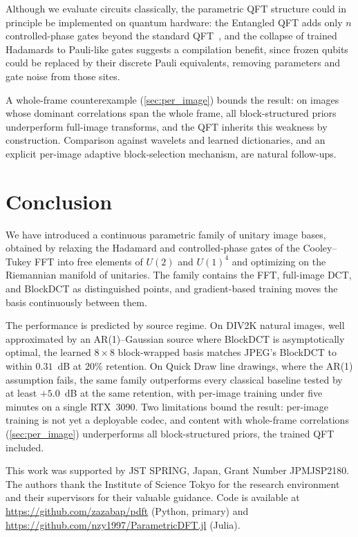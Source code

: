 \documentclass[a4paper, twocolumn]{quantumarticle}
\begin{document}
Although we evaluate circuits classically, the parametric QFT structure could in principle be implemented on quantum hardware: the Entangled QFT adds only $n$ controlled-phase gates beyond the standard QFT~\cite{luo2020yao, markov2008simulating}, and the collapse of trained Hadamards to Pauli-like gates suggests a compilation benefit, since frozen qubits could be replaced by their discrete Pauli equivalents, removing parameters and gate noise from those sites.

A whole-frame counterexample (\cref{sec:per_image}) bounds the result: on images whose dominant correlations span the whole frame, all block-structured priors underperform full-image transforms, and the QFT inherits this weakness by construction. Comparison against wavelets and learned dictionaries, and an explicit per-image adaptive block-selection mechanism, are natural follow-ups.

\section{Conclusion}
\label{sec:conclusion}

We have introduced a continuous parametric family of unitary image bases, obtained by relaxing the Hadamard and controlled-phase gates of the Cooley--Tukey FFT into free elements of $U(2)$ and $U(1)^4$ and optimizing on the Riemannian manifold of unitaries. The family contains the FFT, full-image DCT, and BlockDCT as distinguished points, and gradient-based training moves the basis continuously between them.

The performance is predicted by source regime. On DIV2K natural images, well approximated by an AR(1)--Gaussian source where BlockDCT is asymptotically optimal, the learned $8 \times 8$ block-wrapped basis matches JPEG's BlockDCT to within $0.31$~dB at $20\%$ retention. On Quick Draw line drawings, where the AR(1) assumption fails, the same family outperforms every classical baseline tested by at least $+5.0$~dB at the same retention, with per-image training under five minutes on a single RTX~3090.
Two limitations bound the result: per-image training is not yet a deployable codec, and content with whole-frame correlations (\cref{sec:per_image}) underperforms all block-structured priors, the trained QFT included.

\begin{acknowledgments}
This work was supported by JST SPRING, Japan, Grant Number JPMJSP2180. The authors thank the Institute of Science Tokyo for the research environment and their supervisors for their valuable guidance.
Code is available at \url{https://github.com/zazabap/pdft} (Python, primary) and \url{https://github.com/nzy1997/ParametricDFT.jl} (Julia).
\end{acknowledgments}
\end{document}
